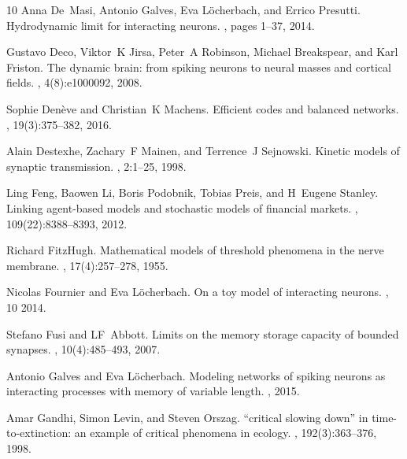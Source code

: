 \documentclass[onefignum,onetabnum]{siamart190516}
\newcommand{\1}{\mathbbm{1}}
\begin{document}
\begin{thebibliography}{10}
Anna De~Masi, Antonio Galves, Eva L{\"o}cherbach, and Errico Presutti.
\newblock Hydrodynamic limit for interacting neurons.
, pages 1--37, 2014.

Gustavo Deco, Viktor~K Jirsa, Peter~A Robinson, Michael Breakspear, and Karl
  Friston.
\newblock The dynamic brain: from spiking neurons to neural masses and cortical
  fields.
, 4(8):e1000092, 2008.

Sophie Den{\`e}ve and Christian~K Machens.
\newblock Efficient codes and balanced networks.
, 19(3):375--382, 2016.

Alain Destexhe, Zachary~F Mainen, and Terrence~J Sejnowski.
\newblock Kinetic models of synaptic transmission.
, 2:1--25, 1998.

Ling Feng, Baowen Li, Boris Podobnik, Tobias Preis, and H~Eugene Stanley.
\newblock Linking agent-based models and stochastic models of financial
  markets.
,
  109(22):8388--8393, 2012.

Richard FitzHugh.
\newblock Mathematical models of threshold phenomena in the nerve membrane.
, 17(4):257--278, 1955.

Nicolas Fournier and Eva L{\"o}cherbach.
\newblock On a toy model of interacting neurons.
, 10 2014.

Stefano Fusi and LF~Abbott.
\newblock Limits on the memory storage capacity of bounded synapses.
, 10(4):485--493, 2007.

Antonio Galves and Eva L{\"o}cherbach.
\newblock Modeling networks of spiking neurons as interacting processes with
  memory of variable length.
, 2015.

Amar Gandhi, Simon Levin, and Steven Orszag.
\newblock “critical slowing down” in time-to-extinction: an example of
  critical phenomena in ecology.
, 192(3):363--376, 1998.


\end{thebibliography}
\end{document}
